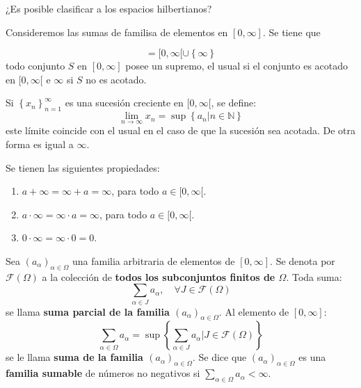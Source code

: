 \documentclass[12pt]{report}
\theoremstyle{largebreak}
\begin{document}
    ¿Es posible clasificar a los espacios hilbertianos?

    Consideremos las sumas de familisa de elementos en $[0,\infty]$. Se tiene que

    \begin{equation*}
        [0,\infty]=[0,\infty[\cup\left\{\infty \right\}
    \end{equation*}
    todo conjunto $S$ en $[0,\infty]$ posee un supremo, el usual si el conjunto es acotado en $[0,\infty[$ e $\infty$ si $S$ no es acotado.

    Si $\left\{x_n \right\}_{n=1}^\infty$ es una sucesión creciente en $[0,\infty[$, se define:
    \begin{equation*}
        \lim_{n\rightarrow\infty}x_n=\sup\left\{a_n\big|n\in\mathbb{N} \right\}
    \end{equation*}
    este límite coincide con el usual en el caso de que la sucesión sea acotada. De otra forma es igual a $\infty$.

    Se tienen las siguientes propiedades:

    \begin{enumerate}
        \item $a+\infty=\infty+a=\infty$, para todo $a\in[0,\infty[$.
        \item $a\cdot \infty=\infty\cdot a=\infty$, para todo $a\in[0,\infty[$.
        \item $0\cdot\infty=\infty\cdot0=0$.
    \end{enumerate}

    \begin{mydef}
        Sea $\left(a_\alpha\right)_{\alpha\in\Omega}$ una familia arbitraria de elementos de $[0,\infty]$. Se denota por $\mathcal{F}(\Omega)$ a la colección de \textbf{todos los subconjuntos finitos de $\Omega$}. Toda suma:
        \begin{equation*}
            \sum_{\alpha\in J}a_\alpha,\quad\forall J\in\mathcal{F}(\Omega)
        \end{equation*}
        se llama \textbf{suma parcial de la familia $\left(a_\alpha\right)_{\alpha\in\Omega}$}. Al elemento de $[0,\infty]$:
        \begin{equation*}
            \sum_{\alpha\in\Omega}a_\alpha=\sup\left\{ \sum_{\alpha\in J}a_\alpha\big|J\in\mathcal{F}(\Omega) \right\}
        \end{equation*}
        se le llama \textbf{suma de la familia $\left(a_\alpha\right)_{\alpha\in\Omega}$}. Se dice que $\left(a_\alpha\right)_{\alpha\in\Omega}$ es una \textbf{familia sumable} de números no negativos si $\sum_{\alpha\in\Omega}a_\alpha<\infty$.
    \end{mydef}
\end{document}
